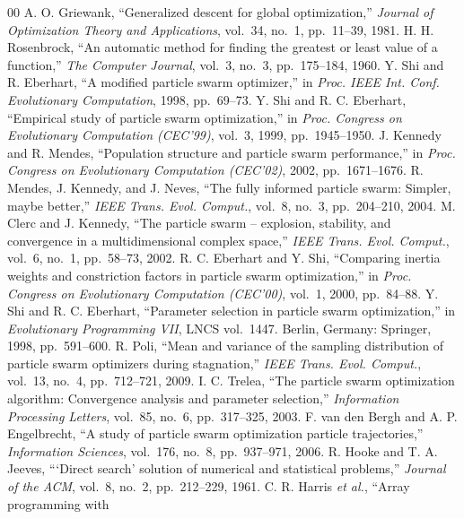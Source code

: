 \documentclass[conference]{IEEEtran}
\begin{document}
\begin{thebibliography}{00}
 A. O. Griewank, ``Generalized descent for global
optimization,'' \textit{Journal of Optimization Theory and Applications},
vol.~34, no.~1, pp.~11--39, 1981.
 H. H. Rosenbrock, ``An automatic method for finding
the greatest or least value of a function,'' \textit{The Computer Journal},
vol.~3, no.~3, pp.~175--184, 1960.
 Y. Shi and R. Eberhart, ``A modified particle swarm
optimizer,'' in \textit{Proc. IEEE Int. Conf. Evolutionary Computation},
1998, pp.~69--73.
 Y. Shi and R. C. Eberhart, ``Empirical study of particle
swarm optimization,'' in \textit{Proc. Congress on Evolutionary Computation
(CEC'99)}, vol.~3, 1999, pp.~1945--1950.
 J. Kennedy and R. Mendes, ``Population structure and
particle swarm performance,'' in \textit{Proc. Congress on Evolutionary
Computation (CEC'02)}, 2002, pp.~1671--1676.
 R. Mendes, J. Kennedy, and J. Neves, ``The fully
informed particle swarm: Simpler, maybe better,'' \textit{IEEE Trans. Evol.
Comput.}, vol.~8, no.~3, pp.~204--210, 2004.
 M. Clerc and J. Kennedy, ``The particle swarm --
explosion, stability, and convergence in a multidimensional complex
space,'' \textit{IEEE Trans. Evol. Comput.}, vol.~6, no.~1, pp.~58--73,
2002.
 R. C. Eberhart and Y. Shi, ``Comparing inertia weights
and constriction factors in particle swarm optimization,'' in \textit{Proc.
Congress on Evolutionary Computation (CEC'00)}, vol.~1, 2000, pp.~84--88.
 Y. Shi and R. C. Eberhart, ``Parameter selection in
particle swarm optimization,'' in \textit{Evolutionary Programming VII},
LNCS vol.~1447. Berlin, Germany: Springer, 1998, pp.~591--600.
 R. Poli, ``Mean and variance of the sampling
distribution of particle swarm optimizers during stagnation,''
\textit{IEEE Trans. Evol. Comput.}, vol.~13, no.~4, pp.~712--721, 2009.
 I. C. Trelea, ``The particle swarm optimization
algorithm: Convergence analysis and parameter selection,''
\textit{Information Processing Letters}, vol.~85, no.~6, pp.~317--325, 2003.
 F. van den Bergh and A. P. Engelbrecht, ``A study
of particle swarm optimization particle trajectories,'' \textit{Information
Sciences}, vol.~176, no.~8, pp.~937--971, 2006.
 R. Hooke and T. A. Jeeves, ```Direct search' solution of
numerical and statistical problems,'' \textit{Journal of the ACM}, vol.~8,
no.~2, pp.~212--229, 1961.
 C. R. Harris \textit{et al.}, ``Array programming with

\end{thebibliography}
\end{document}
